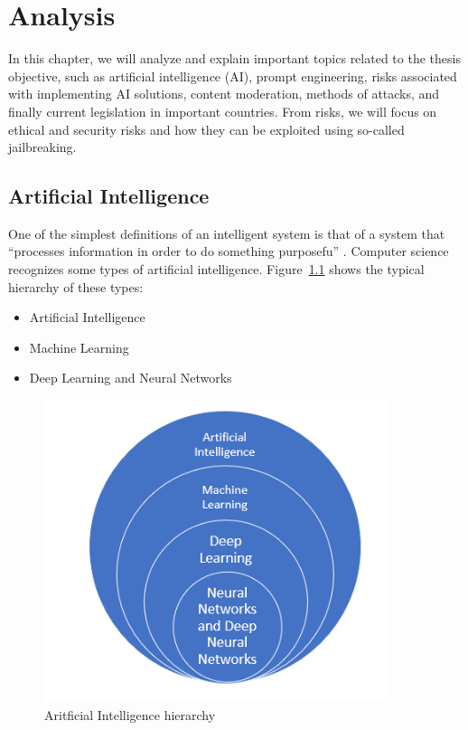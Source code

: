 \chapter{Analysis}

In this chapter, we will analyze and explain important topics related to the thesis objective, such as artificial intelligence (AI), prompt engineering, risks associated with implementing AI solutions, content moderation, methods of attacks, and finally current legislation in important countries. From risks, we will focus on ethical and security risks and how they can be exploited using so-called jailbreaking.

\section{Artificial Intelligence}
One of the simplest definitions of an intelligent system is that of a system
that ``processes information in order to do something purposefu'' \cite{Dignum_2019}.
Computer science recognizes some types of artificial intelligence. Figure~\ref{fig:AI-ML-DL-NN} shows the typical hierarchy of these types:

\begin{itemize}
    \item Artificial Intelligence
    \item Machine Learning
    \item Deep Learning and Neural Networks
\end{itemize}

\begin{figure}[htpb]
\begin{centering}
\includegraphics[width=10cm]{./assets/images/final deep learning.png}
\par\end{centering}
\caption{Aritficial Intelligence hierarchy \cite{ai_hierarchy_pic}
\label{fig:AI-ML-DL-NN}}
\end{figure}

